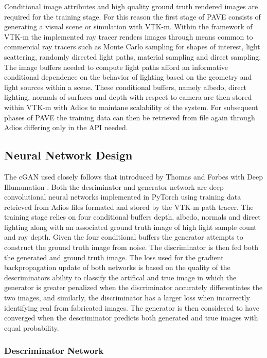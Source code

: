 \documentclass[sigconf,authordraft]{acmart}
\begin{document}
Conditional image attributes and high quality ground truth rendered images are required for the training stage. For this reason the first stage of PAVE consists of generating a visual scene or simulation with VTK-m. Within the framework of VTK-m the implemented ray tracer renders images through means common to commercial ray tracers such as Monte Carlo sampling for shapes of interest, light scattering, randomly directed light paths, material sampling and direct sampling. The image buffers needed to compute light paths afford an informative conditional dependence on the behavior of lighting based on the geometry and light sources within a scene. These conditional buffers, namely albedo, direct lighting, normals of surfaces and depth with respect to camera are then stored within VTK-m with Adios to maintane scalability of the system. For subsequent phases of PAVE the training data can then be retrieved from file again through Adios differing only in the API needed. 

\subsection{Neural Network Design}

The cGAN used closely follows that introduced by Thomas and Forbes with Deep Illumunation \cite{deepillum}. Both the desriminator and generator network are deep convolutional neural networks implemented in PyTorch using training data retrieved from Adios files formated and stored by the VTK-m path tracer. The training stage relies on four conditional buffers depth, albedo, normals and direct lighting along with an associated ground truth image of high light sample count and ray depth. Given the four conditional buffers the generator attempts to construct the ground truth image from noise. The discriminator is then fed both the generated and ground truth image. The loss used for the gradient backpropagation update of both networks is based on the quality of the descriminators ability to classify the artifical and true image in which the generator is greater penalized when the discriminator accurately differentiates the two images, and similarly, the discriminator has a larger loss when incorrectly identifying real from fabricated images. The generator is then considered to have converged when the descriminator predicts both generated and true images with equal probability. 

\subsubsection{Descriminator Network}
\end{document}
